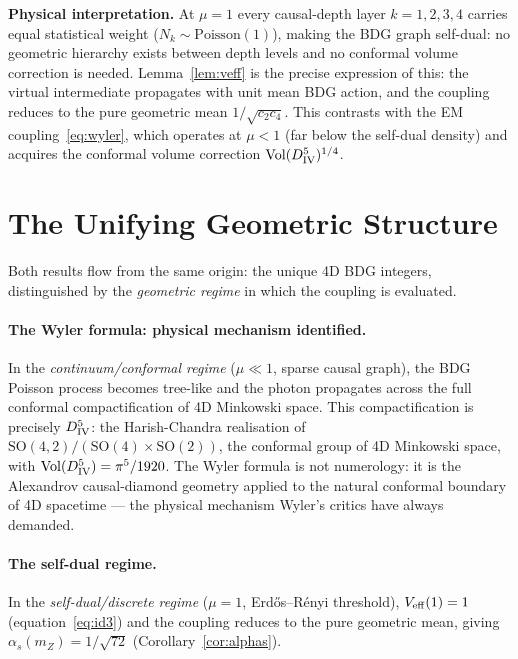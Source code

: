 \documentclass[12pt,a4paper]{article}
\theoremstyle{definition}
\begin{document}
\medskip
\noindent\textbf{Physical interpretation.}  At $\mu=1$ every causal-depth
layer $k=1,2,3,4$ carries equal statistical weight
($N_k\sim\mathrm{Poisson}(1)$), making the BDG graph self-dual: no
geometric hierarchy exists between depth levels and no conformal volume
correction is needed.  Lemma~\ref{lem:veff} is the precise expression of
this: the virtual intermediate propagates with unit mean BDG action, and
the coupling reduces to the pure geometric mean $1/\!\sqrt{c_2 c_4}$.
This contrasts with the EM coupling~\eqref{eq:wyler}, which operates at
$\mu < 1$ (far below the self-dual density) and acquires the conformal
volume correction $\mathrm{Vol}(D_{\rm IV}^5)^{1/4}$.

\section{The Unifying Geometric Structure}
\label{sec:unity}

Both results flow from the same origin: the unique 4D BDG integers,
distinguished by the \emph{geometric regime} in which the coupling is evaluated.

\paragraph{The Wyler formula: physical mechanism identified.}
In the \emph{continuum/conformal regime} ($\mu \ll 1$, sparse causal graph),
the BDG Poisson process becomes tree-like and the photon propagates across
the full conformal compactification of 4D Minkowski space.  This
compactification is precisely $D_{\rm IV}^5$: the Harish-Chandra realisation
of $\mathrm{SO}(4,2)/(\mathrm{SO}(4)\times\mathrm{SO}(2))$, the conformal
group of 4D Minkowski space, with $\mathrm{Vol}(D_{\rm IV}^5) = \pi^5/1920$.
The Wyler formula is not numerology: it is the Alexandrov causal-diamond
geometry applied to the natural conformal boundary of 4D spacetime --- the
physical mechanism Wyler's critics have always demanded.

\paragraph{The self-dual regime.}
In the \emph{self-dual/discrete regime} ($\mu=1$, Erd\H{o}s--R\'{e}nyi
threshold), $V_{\rm eff}(1)=1$ (equation~\eqref{eq:id3}) and the coupling
reduces to the pure geometric mean, giving $\alpha_s(m_Z) = 1/\sqrt{72}$
(Corollary~\ref{cor:alphas}).
\end{document}
